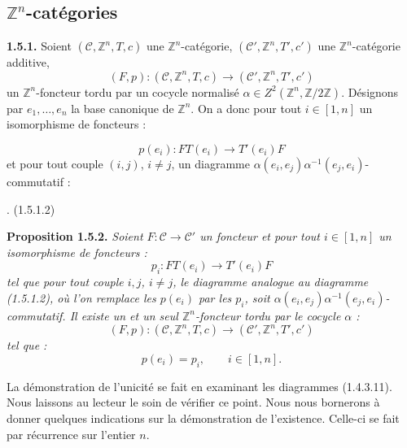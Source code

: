 %
\subsection{\texorpdfstring{$\mathbb Z^n$}{Z n}-catégories}

\noindent\textbf{1.5.1.}\quad
Soient $(\mathcal C,\mathbb Z^n,T,c)$ une $\mathbb Z^n$-catégorie,
$(\mathcal C',\mathbb Z^n,T',c')$ une $\mathbb Z^n$-catégorie
additive,
\[
  (F,p)\colon(\mathcal C,\mathbb Z^n,T,c)
  \longrightarrow(\mathcal C',\mathbb Z^n,T',c')
\]
un $\mathbb Z^n$-foncteur tordu par un cocycle normalisé
$\alpha\in Z^2(\mathbb Z^n,\mathbb Z/2\mathbb Z)$. Désignons par
$e_1,\ldots,e_n$ la base canonique de $\mathbb Z^n$. On a donc pour
tout $i\in[1,n]$ un isomorphisme de foncteurs :

\begin{equation}
  p(e_i)\colon FT(e_i)\longrightarrow T'(e_i)F
  \tag{1.5.1.1}
\end{equation}
et pour tout couple $(i,j)$, $i\ne j$, un diagramme
$\alpha(e_i,e_j)\alpha^{-1}(e_j,e_i)$-commutatif :

\begin{center}
  \;.
  \hfill\textup{(1.5.1.2)}
\end{center}

\noindent\textbf{Proposition 1.5.2.}\quad
\emph{Soient $F\colon\mathcal C\to\mathcal C'$ un foncteur et pour
tout $i\in[1,n]$ un isomorphisme de foncteurs :
\[
  p_i\colon FT(e_i)\longrightarrow T'(e_i)F
\]
tel que pour tout couple $i,j$, $i\ne j$, le diagramme analogue au
diagramme (1.5.1.2), où l'on remplace les $p(e_i)$ par les $p_i$, soit
$\alpha(e_i,e_j)\alpha^{-1}(e_j,e_i)$-commutatif. Il existe un et un
seul $\mathbb Z^n$-foncteur tordu par le cocycle $\alpha$ :
\[
  (F,p)\colon(\mathcal C,\mathbb Z^n,T,c)
  \longrightarrow(\mathcal C',\mathbb Z^n,T',c')
\]
tel que :
\[
  p(e_i)=p_i,
  \qquad i\in[1,n].
\]}

La démonstration de l'unicité se fait en examinant les diagrammes
(1.4.3.11). Nous laissons au lecteur le soin de vérifier ce point. Nous
nous bornerons à donner quelques indications sur la démonstration de
l'existence. Celle-ci se fait par récurrence sur l'entier $n$.
